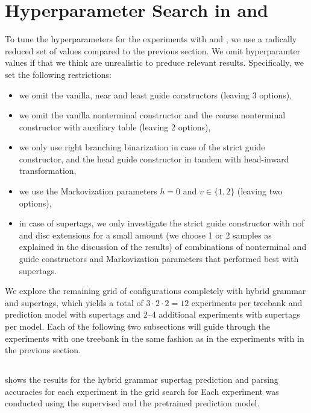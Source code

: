 \documentclass[../../document.tex]{subfiles}
\begin{document}
    \section{Hyperparameter Search in   and }\label{sec:gridsearch:other}
    To tune the hyperparameters for the experiments with  and \tiger{}, we use a radically reduced set of values compared to the previous section.
    We omit hyperparamter values if that we think are unrealistic to preduce relevant results.
    Specifically, we set the following restrictions:
    \begin{itemize}
        \item we omit the vanilla, near and least guide constructors (leaving 3 options),
        \item we omit the vanilla nonterminal constructor and the coarse nonterminal constructor with auxiliary table (leaving 2 options), 
        \item we only use right branching binarization in case of the strict guide constructor, and the head guide constructor in tandem with head-inward transformation,
        \item we use the Markovization parameters \(h = 0\) and \(v \in \{1,2\}\) (leaving two options),
        \item in case of  supertags, we only investigate the strict guide constructor with nof and disc extensions for a small amount (we choose 1 or 2 samples as explained in the discussion of the results) of combinations of nonterminal and guide constructors and Markovization parameters that performed best with  supertags.
    \end{itemize}

    We explore the remaining grid of configurations completely with hybrid grammar and  supertags, which yields a total of $3 \cdot 2 \cdot 2 = 12$ experiments per treebank and prediction model with  supertags and 2--4 additional experiments with  supertags per model.
    Each of the following two subsections will guide through the experiments with one treebank in the same fashion as in the experiments with \negra{} in the previous section.

    \subsection{}
     shows the results for the hybrid grammar supertag prediction and parsing accuracies for each experiment in the grid search for 
    Each experiment was conducted using the supervised and the pretrained prediction model.
    
\end{document}
